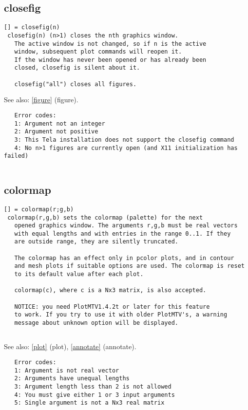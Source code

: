 \documentclass[a4paper]{article}
\begin{document}
\subsection{closefig\label{closefig}}

\begin{tscreen}
\begin{verbatim}
[] = closefig(n)
 closefig(n) (n>1) closes the nth graphics window.
   The active window is not changed, so if n is the active
   window, subsequent plot commands will reopen it.
   If the window has never been opened or has already been
   closed, closefig is silent about it.

   closefig("all") closes all figures.
\end{verbatim}

See also: \ref{figure} {(figure)}.
\begin{verbatim}
   Error codes:
   1: Argument not an integer
   2: Argument not positive
   3: This Tela installation does not support the closefig command
   4: No n>1 figures are currently open (and X11 initialization has failed)
   
\end{verbatim}
\end{tscreen}



\subsection{colormap\label{colormap}}

\begin{tscreen}
\begin{verbatim}
[] = colormap(r;g,b)
 colormap(r,g,b) sets the colormap (palette) for the next
   opened graphics window. The arguments r,g,b must be real vectors
   with equal lengths and with entries in the range 0..1. If they
   are outside range, they are silently truncated.

   The colormap has an effect only in pcolor plots, and in contour
   and mesh plots if suitable options are used. The colormap is reset
   to its default value after each plot.

   colormap(c), where c is a Nx3 matrix, is also accepted.
   
   NOTICE: you need PlotMTV1.4.2t or later for this feature
   to work. If you try to use it with older PlotMTV's, a warning
   message about unknown option will be displayed.
   
\end{verbatim}

See also: \ref{plot} {(plot)}, \ref{annotate} {(annotate)}.
\begin{verbatim}
   Error codes:
   1: Argument is not real vector
   2: Arguments have unequal lengths
   3: Argument length less than 2 is not allowed
   4: You must give either 1 or 3 input arguments
   5: Single argument is not a Nx3 real matrix
\end{verbatim}
\end{tscreen}
\end{document}
